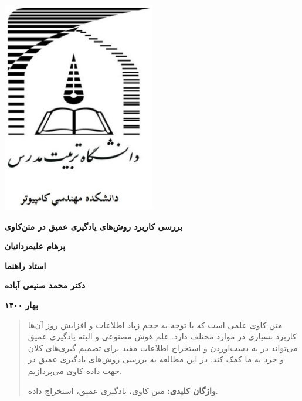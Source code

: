\documentclass[12pt, a4paper, oneside]{report}
\begin{document}
\begin{titlepage}

\begin{center}

\includegraphics[width=0.5\textwidth]{tarbiat.jpg}
\vspace{1.5cm}

\LARGE
\textbf{بررسی کاربرد روش‌های یادگیری عمیق در متن‌کاوی}
\vspace{1cm}

\Large
\textbf{پرهام علیمردانیان}
\vspace{1.5cm}

\large
\textbf{استاد راهنما}

\textbf{دکتر محمد صنیعی آباده}
\vspace{3cm}

\large
\textbf{بهار ۱۴۰۰}


\end{center}

\end{titlepage}


\begin{abstract}
    متن کاوی علمی است که با توجه به حجم زیاد اطلاعات و افزایش روز آن‌ها کاربرد بسیاری در موارد
    مختلف دارد. علم هوش مصنوعی و البته یادگیری عمیق می‌تواند در به دست‌اوردن و استخراج اطلاعات مفید
    برای تصمیم گیری‌های کلان و خرد به ما کمک کند. در این مطالعه به بررسی روش‌های یادگیری عمیق
    در جهت داده کاوی می‌پردازیم.

    \textbf{واژگان کلیدی:}
    متن کاوی، یادگیری عمیق، استخراج داده.
\end{abstract}

\tableofcontents
\listoffigures
\listoftables
\end{document}
